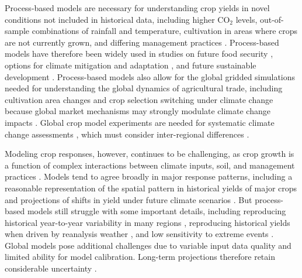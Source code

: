 \documentclass[gmd, manuscript]{copernicus} %
\begin{document}
Process-based models are necessary for understanding crop yields in novel conditions not included in historical data, including higher CO$_2$ levels, out-of-sample combinations of rainfall and temperature, cultivation in areas where crops are not currently grown, and differing management practices \citep[e.g.][]{pugh_climate_2016, Roberts2017,minoli2019modelling}. Process-based models have therefore been widely used in studies on future food security \citep{wheeler2013climate, Elliott14, frieler2017assessing}, options for climate mitigation \citep{muller2015} and adaptation \citep{challinor2018improving}, and future sustainable development \citep{humpenoder2018large, jagermeyr_reconciling_2017}.
Process-based models also allow for the global gridded simulations needed for understanding the global dynamics of agricultural trade, including cultivation area changes and crop selection switching under climate change \citep{rosenzweig2018,ruane2018} because global market mechanisms may strongly modulate climate change impacts \citep{Stevanovic2016,hasegawa2018risk}. 
Global crop model experiments are needed for systematic climate change assessments \citep{muller_global_2017}, which must consider inter-regional differences \citep[e.g.][]{Nelson2014, Wiebe_2015}.

Modeling crop responses, however, continues to be challenging, as crop growth is a function of complex interactions between climate inputs, soil, and management practices \citep{Boote13,rotter2011}. 
Models tend to agree broadly in major response patterns, including a reasonable representation of the spatial pattern in historical yields of major crops and projections of shifts in yield under future climate scenarios \citep[e.g.][]{Elliott2015, muller_global_2017}. 
But process-based models still struggle with some important details, including reproducing historical year-to-year variability in many regions \citep[e.g.][]{muller_global_2017, Jag2018}, reproducing historical yields when driven by reanalysis weather \citep[e.g.][]{Glotter14}, and low sensitivity to extreme events \citep[e.g.][]{Glotter15,schewe2019}. 
Global models pose additional challenges due to variable input data quality and limited ability for model calibration.
Long-term projections therefore retain considerable uncertainty \citep{WOLF2002217, JAGTAP200273, iizumi2010, ANGULO201332, Asseng2013, Asseng2015}. 
\end{document}
